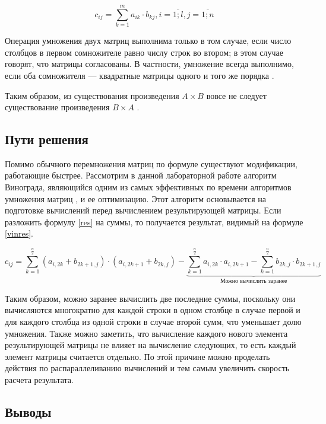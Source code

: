 \documentclass[a4paper,12pt]{article}
\begin{document}
\begin{equation}\label{res}
    c_{ij} = \sum_{k=1}^m a_{ik} \cdot b_{kj}, i = \overline{1;l}, j = \overline{1;n}
\end{equation}

Операция умножения двух матриц выполнима только в том случае, если число столбцов в
первом сомножителе равно числу строк во втором; в этом случае говорят, что матрицы
согласованы. В частности, умножение всегда выполнимо, если оба сомножителя —
квадратные матрицы одного и того же порядка \cite{litr}.

Таким образом, из существования произведения $A \times B$ вовсе не следует
существование произведения $B \times A$ \cite{litr}.
\subsection{Пути решения}

Помимо обычного перемножения матриц по формуле существуют модификации, работающие
быстрее. Рассмотрим в данной лабораторной работе алгоритм Винограда, являющийся одним
из самых эффективных по времени алгоритмов умножения матриц \cite{haskell},
и ее оптимизацию. Этот алгоритм основывается на подготовке вычислений перед вычислением
результирующей матрицы. Если разложить формулу \ref{res} на суммы, то получается
результат, видимый на формуле \ref{vinres}.

\begin{equation}\label{vinres}
    c_{ij} =
    \sum_{k=1}^{\frac{n}{2}} (a_{i,2k} + b_{2k+1,j}) \cdot (a_{i,2k+1} + b_{2k,j}) -
    \underbrace{\sum_{k=1}^{\frac{n}{2}} a_{i,2k} \cdot a_{i,2k+1} -
    \sum_{k=1}^{\frac{n}{2}} b_{2k,j} \cdot b_{2k+1,j}}_\text{Можно вычислить заранее}
\end{equation}

Таким образом, можно заранее вычислить две последние суммы, поскольку они вычисляются
многократно для каждой строки в одном столбце в случае первой и для каждого столбца
из одной строки в случае второй сумм, что уменьшает долю умножения\cite{haskell}. Также
можно заметить, что вычисление каждого нового элемента результирующей матрицы не
влияет на вычисление следующих, то есть каждый элемент матрицы считается отдельно.
По этой причине можно проделать действия по распараллеливанию вычислений и тем самым
увеличить скорость расчета результата.

\subsection{Выводы}
\end{document}
